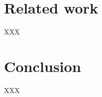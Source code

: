 \documentclass{article}
\begin{document}


\section{Related work} \label{sec:relwork}
XXX

\section{Conclusion} \label{sec:conclusion}
XXX



\end{document}

